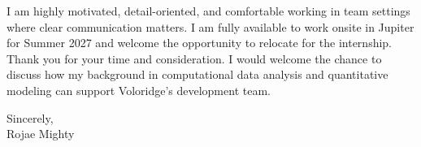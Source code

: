 \documentclass[11pt,letterpaper]{article}
\begin{document}
I am highly motivated, detail-oriented, and comfortable working in team settings where clear communication matters. I am fully available to work onsite in Jupiter for Summer 2027 and welcome the opportunity to relocate for the internship. Thank you for your time and consideration. I would welcome the chance to discuss how my background in computational data analysis and quantitative modeling can support Voloridge's development team.

\vspace{6pt}
Sincerely,\\[18pt]
Rojae Mighty
\end{document}
